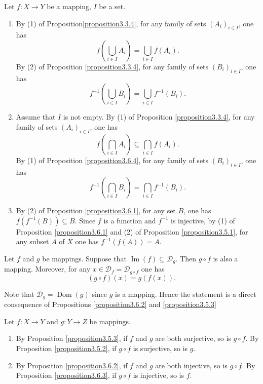 \begin{remark}
   Let \( f: X \to Y \) be a mapping,  \( I \) be a set.
\begin{enumerate}
    \item By (1) of Proposition\ref{proposition3.3.4},  for any family of sets \( (A_i)_{i \in I} \),  one has
    \[
    f\left(\bigcup_{i \in I} A_i\right) = \bigcup_{i \in I} f(A_i).
    \]
    By (2) of Proposition \ref{proposition3.3.4},  for any family of sets \( (B_i)_{i \in I} \),  one has
    \[
    f^{-1}\left(\bigcup_{i \in I} B_i\right) = \bigcup_{i \in I} f^{-1}(B_i).
    \]
    \item Assume that \( I \) is not empty. By (1) of Proposition \ref{proposition3.3.4},  for any family of sets \( (A_i)_{i \in I} \),  one has
    \[
    f\left(\bigcap_{i \in I} A_i\right) \subseteq \bigcap_{i \in I} f(A_i).
    \]
    By (1) of Proposition \ref{proposition3.6.4},  for any family of sets \( (B_i)_{i \in I} \),  one has
    \[
    f^{-1}\left(\bigcap_{i \in I} B_i\right) = \bigcap_{i \in I} f^{-1}(B_i).
    \]
    \item By (2) of Proposition \ref{proposition3.6.1},  for any set \( B \),  one has \( f(f^{-1}(B)) \subseteq B \). Since \( f \) is a function and \( f^{-1} \) is injective,  by (1) of Proposition \ref{proposition3.6.1} and (2) of Proposition \ref{proposition3.5.1},  for any subset \( A \) of \( X \) one has \( f^{-1}(f(A)) = A \).
\end{enumerate}

 
\end{remark}
\begin{propositionenv}\label{proposition3.7.1}
    Let \( f \) and \( g \) be mappings. Suppose that \( \operatorname{Im}(f) \subseteq \mathscr{D}_g \). Then \( g \circ f \) is also a mapping. Moreover,  for any \( x \in \mathscr{D}_f = \mathscr{D}_{g \circ f} \) one has
\[
(g \circ f)(x) = g(f(x)).
\]

\end{propositionenv}

\begin{proofenv}
   Note that \( \mathscr{D}_g = \operatorname{Dom}(g) \) since \( g \) is a mapping. Hence the statement is a direct consequence of Propositions \ref{proposition3.6.2} and \ref{proposition3.5.3}
 
\end{proofenv}

\begin{remark}\label{remark3.7.2}
    Let \( f: X \to Y \) and \( g: Y \to Z \) be mappings.
\begin{enumerate}
    \item By Proposition \ref{proposition3.5.3},  if \( f \) and \( g \) are both surjective,  so is \( g \circ f \). By Proposition \ref{proposition3.5.2},  if \( g \circ f \) is surjective,  so is \( g \).
    \item By Proposition \ref{proposition3.6.2},  if \( f \) and \( g \) are both injective,  so is \( g \circ f \). By Proposition \ref{proposition3.6.3},  if \( g \circ f \) is injective,  so is \( f \).
\end{enumerate}

\end{remark}

